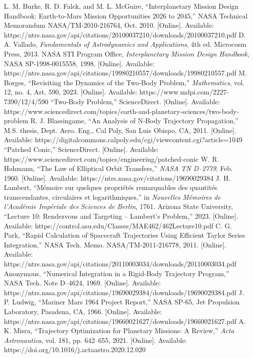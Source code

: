 \documentclass[conference]{IEEEtran}
\begin{document}
	\begin{thebibliography}{00}
			
			L. M. Burke, R. D. Falck, and M. L. McGuire, “Interplanetary Mission Design Handbook: Earth‐to‐Mars Mission Opportunities 2026 to 2045,” NASA Technical Memorandum NASA/TM‐2010‐216764, Oct. 2010. [Online]. Available: https://ntrs.nasa.gov/api/citations/20100037210/downloads/20100037210.pdf
			D. A. Vallado, \textit{Fundamentals of Astrodynamics and Applications}, 4th ed. Microcosm Press, 2013.
			NASA STI Program Office, \textit{Interplanetary Mission Design Handbook}, NASA SP‐1998‐0015558, 1998. [Online]. Available: https://ntrs.nasa.gov/api/citations/19980210557/downloads/19980210557.pdf
			M. Borges, “Revisiting the Dynamics of the Two‐Body Problem,” \textit{Mathematics}, vol. 12, no. 4, Art. 590, 2023. [Online]. Available: https://www.mdpi.com/2227-7390/12/4/590
			“Two‐Body Problem,” ScienceDirect. [Online]. Available: https://www.sciencedirect.com/topics/earth-and-planetary-sciences/two-body-problem
			R. J. Blassingame, “An Analysis of N‐Body Trajectory Propagation,” M.S. thesis, Dept. Aero. Eng., Cal Poly, San Luis Obispo, CA, 2011. [Online]. Available: https://digitalcommons.calpoly.edu/cgi/viewcontent.cgi?article=1049
			“Patched Conic,” ScienceDirect. [Online]. Available: https://www.sciencedirect.com/topics/engineering/patched-conic
			W. R. Hohmann, “The Law of Elliptical Orbit Transfers,” \textit{NASA TN D–2779}, Feb. 1960. [Online]. Available: https://ntrs.nasa.gov/citations/19690029384
			J. H. Lambert, “Mémoire sur quelques propriétés remarquables des quantités transcendantes, circulaires et logarithmiques,” in \textit{Nouvelles Mémoires de l’Académie Impériale des Sciences de Berlin}, 1761.
			Arizona State University, “Lecture 10: Rendezvous and Targeting – Lambert’s Problem,” 2023. [Online]. Available: https://control.asu.edu/Classes/MAE462/462Lecture10.pdf
			C. G. Park, “Rapid Calculation of Spacecraft Trajectories Using Efficient Taylor Series Integration,” NASA Tech. Memo. NASA/TM‐2011‐216778, 2011. [Online]. Available: https://ntrs.nasa.gov/api/citations/20110003034/downloads/20110003034.pdf
			Anonymous, “Numerical Integration in a Rigid‐Body Trajectory Program,” NASA Tech. Note D–4624, 1969. [Online]. Available: https://ntrs.nasa.gov/api/citations/19690029384/downloads/19690029384.pdf
			J. P. Ludwig, “Mariner Mars 1964 Project Report,” NASA SP-65, Jet Propulsion Laboratory, Pasadena, CA, 1966. [Online]. Available: https://ntrs.nasa.gov/api/citations/19660021627/downloads/19660021627.pdf
			A. K. Misra, “Trajectory Optimization for Planetary Missions: A Review,” \textit{Acta Astronautica}, vol. 181, pp. 642–655, 2021. [Online]. Available: https://doi.org/10.1016/j.actaastro.2020.12.020
	\end{thebibliography}
	
\end{document}
